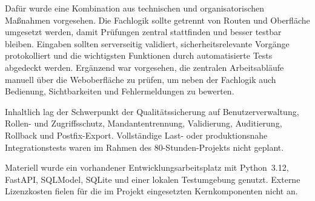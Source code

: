 Dafür wurde eine Kombination aus technischen und organisatorischen Maßnahmen
vorgesehen. Die Fachlogik sollte getrennt von Routen und Oberfläche umgesetzt
werden, damit Prüfungen zentral stattfinden und besser testbar bleiben.
Eingaben sollten serverseitig validiert, sicherheitsrelevante Vorgänge
protokolliert und die wichtigsten Funktionen durch automatisierte Tests
abgedeckt werden. Ergänzend war vorgesehen, die zentralen Arbeitsabläufe
manuell über die Weboberfläche zu prüfen, um neben der Fachlogik auch
Bedienung, Sichtbarkeiten und Fehlermeldungen zu bewerten.

Inhaltlich lag der Schwerpunkt der Qualitätssicherung auf Benutzerverwaltung,
Rollen- und Zugriffsschutz, Mandantentrennung, Validierung, Auditierung,
Rollback und Postfix-Export. Vollständige Last- oder produktionsnahe
Integrationstests waren im Rahmen des 80-Stunden-Projekts nicht geplant.

Materiell wurde ein vorhandener Entwicklungsarbeitsplatz mit Python~3.12,
FastAPI, SQLModel, SQLite und einer lokalen Testumgebung genutzt. Externe
Lizenzkosten fielen für die im Projekt eingesetzten Kernkomponenten nicht an.
